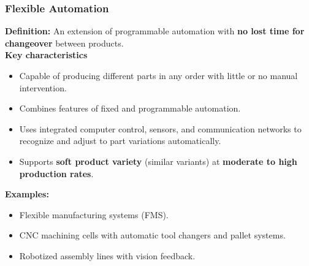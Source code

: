 \begin{frame}
	\frametitle{Flexible Automation}
  \textbf{Definition:}  
  An extension of programmable automation with \textbf{no lost time for changeover} between products.\\
  \vspace{2mm}
  \textbf{Key characteristics}
  \begin{itemize}
    \item Capable of producing different parts in any order with little or no manual intervention.
    \item Combines features of fixed and programmable automation.
    \item Uses integrated computer control, sensors, and communication networks to recognize and adjust to part variations automatically.
    \item Supports \textbf{soft product variety} (similar variants) at \textbf{moderate to high production rates}.
  \end{itemize}
  \vspace{3mm}
  \textbf{Examples:}
  \begin{itemize}
    \item Flexible manufacturing systems (FMS).
    \item CNC machining cells with automatic tool changers and pallet systems.
    \item Robotized assembly lines with vision feedback.
  \end{itemize}
\end{frame}
